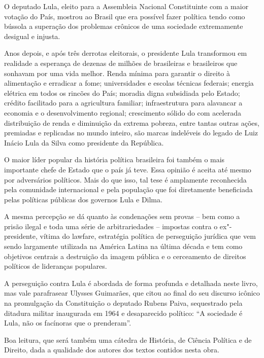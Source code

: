 O deputado Lula, eleito para a Assembleia Nacional Constituinte com a
maior votação do País, mostrou ao Brasil que era possível fazer política
tendo como bússola a superação dos problemas crônicos de uma sociedade
extremamente desigual e injusta.

Anos depois, e após três derrotas eleitorais, o presidente Lula
transformou em realidade a esperança de dezenas de milhões de
brasileiras e brasileiros que sonhavam por uma vida melhor. Renda mínima
para garantir o direito à alimentação e erradicar a fome; universidades
e escolas técnicas federais; energia elétrica em todos os rincões do
País; moradia digna subsidiada pelo Estado; crédito facilitado para a
agricultura familiar; infraestrutura para alavancar a economia e o
desenvolvimento regional; crescimento sólido do  com acelerada
distribuição de renda e diminuição da extrema pobreza, entre tantas
outras ações, premiadas e replicadas no mundo inteiro, são marcas
indeléveis do legado de Luiz Inácio Lula da Silva como presidente da
República.

O maior líder popular da história política brasileira foi também o mais
importante chefe de Estado que o país já teve. Essa opinião é aceita até
mesmo por adversários políticos. Mais do que isso, tal tese é amplamente
reconhecida pela comunidade internacional e pela população que foi
diretamente beneficiada pelas políticas públicas dos governos Lula e
Dilma.

A mesma percepção se dá quanto às condenações sem provas -- bem como a
prisão ilegal e toda uma série de arbitrariedades -- impostas contra o
ex"-presidente, vítima do lawfare, estratégia política de perseguição
jurídica que vem sendo largamente utilizada na América Latina na última
década e tem como objetivos centrais a destruição da imagem pública e o
cerceamento de direitos políticos de lideranças populares.

A perseguição contra Lula é abordada de forma profunda e detalhada neste
livro, mas vale parafrasear Ulysses Guimarães, que citou ao final do seu
discurso icônico na promulgação da Constituição o deputado Rubens Paiva,
sequestrado pela ditadura militar inaugurada em 1964 e desaparecido
político: ``A sociedade é Lula, não os facínoras que o prenderam''.

Boa leitura, que será também uma cátedra de História, de Ciência
Política e de Direito, dada a qualidade dos autores dos textos contidos
nesta obra.
